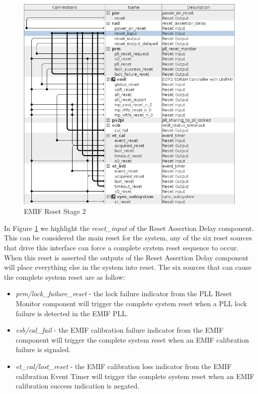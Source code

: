 \documentclass{article}
\begin{document}
\begin{flushleft}
\begin{figure}[H]
\centering
\includegraphics[scale=0.675]{emif_reset_stage_2}
\caption{EMIF Reset Stage 2}
\label{fig:emif_reset_stage_2}
\end{figure}

In Figure \ref{fig:emif_reset_stage_2} we highlight the \emph{reset\_input} of the Reset Assertion Delay component.  This can be considered the main reset for the system, any of the six reset sources that drive this interface can force a complete system reset sequence to occur.  When this reset is asserted the outputs of the Reset Assertion Delay component will place everything else in the system into reset.  The six sources that can cause the complete system reset are as follow:

\begin{itemize}
\item \emph{prm/lock\_failure\_reset} - the lock failure indicator from the PLL Reset Monitor component will trigger the complete system reset when a PLL lock failure is detected in the EMIF PLL.

\item \emph{esb/cal\_fail} - the EMIF calibration failure indicator from the EMIF component will trigger the complete system reset when an EMIF calibration failure is signaled.

\item \emph{et\_cal/lost\_reset} - the EMIF calibration loss indicator from the EMIF calibration Event Timer will trigger the complete system reset when an EMIF calibration success indication is negated.


\end{itemize}
\end{flushleft}
\end{document}
